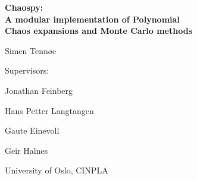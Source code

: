 \documentclass[handout]{beamer}
\begin{document}
\begin{frame}
\begin{center}
    \textbf{\color{myred}\Large Chaospy: \\ \vspace{1mm} A modular implementation of Polynomial\\ \vspace{1mm} Chaos expansions and Monte Carlo methods}
\end{center}


     \large \vspace{8mm} Simen Tennøe

      \vspace{6mm}
      \footnotesize Supervisors:

      \vspace{1mm}
      Jonathan Feinberg

      Hans Petter Langtangen

      Gaute Einevoll

      Geir Halnes

      \vspace{5mm}
    \small University of Oslo, CINPLA



\end{frame}
\end{document}
